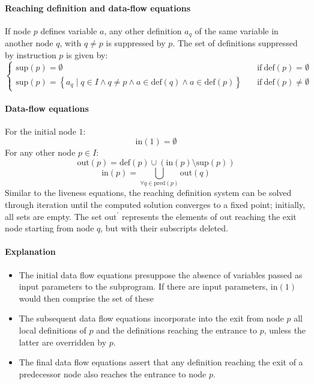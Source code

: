\paragraph*{Reaching definition and data-flow equations}
If node $p$ defines variable $a$, any other definition $a_q$ of the same variable in another node $q$, with $q \neq p$ is suppressed by $p$.
The set of definitions suppressed by instruction $p$ is given by:
\[
\begin{cases}
    \text{sup}(p) = \emptyset \quad                                                                                             & \text{if} \ \text{def}(p) = \emptyset    \\
    \text{sup}(p) = \left\{ a_q \mid q \in I \land q \neq p \land a \in \text{def} (q) \land a \in \text{def}(p) \right\} \quad & \text{if} \ \text{def}(p) \neq \emptyset
\end{cases}
\]

\paragraph*{Data-flow equations}
For the initial node $1$:
\[\text{in}(1) = \emptyset\]
For any other node $p \in I$:
\[\text{out}(p) = \text{def}(p) \cup \left( \text{in}(p) \setminus \text{sup}(p) \right)\]
\[\text{in}(p) = \bigcup_{\forall q \in  \text{pred}(p)} \text{out}(q)\]
Similar to the liveness equations, the reaching definition system can be solved through iteration until the computed solution converges to a fixed point; initially, all sets are empty. 
The set $\text{out}^{'}$ represents the elements of $\text{out}$ reaching the exit node starting from node $q$, but with their subscripts deleted.

\paragraph*{Explanation}
\begin{itemize}
    \item The initial data flow equations presuppose the absence of variables passed as input parameters to the subprogram.
        If there are input parameters, $\text{in}(1)$ would then comprise the set of these 
    \item The subsequent data flow equations incorporate into the exit from node $p$ all local definitions of $p$ and the definitions reaching the entrance to $p$, unless the latter are overridden by $p$.
    \item The final data flow equations assert that any definition reaching the exit of a predecessor node also reaches the entrance to node $p$.
\end{itemize}

